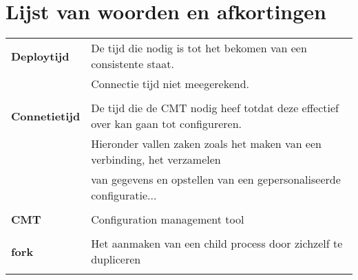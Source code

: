


\chapter*{Lijst van woorden en afkortingen}

\begin{tabular}{l  l }
\textbf{Deploytijd} & De tijd die nodig is tot het bekomen van een consistente staat. \\ &Connectie tijd niet meegerekend. \\ \\
\textbf{Connetietijd} & De tijd die de CMT nodig heef totdat deze effectief over kan gaan tot configureren. \\ &  Hieronder vallen zaken zoals het maken van een verbinding, het verzamelen  \\ & van gegevens en opstellen van een gepersonaliseerde configuratie... \\ \\
\textbf{CMT} & Configuration management tool \\ \\
\textbf{fork} & Het aanmaken van een child process door zichzelf te dupliceren \autocite{forkmeaning} \\ \\
\end{tabular}